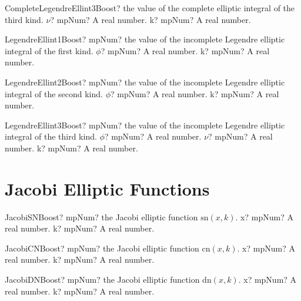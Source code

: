\documentclass[12pt,a4paper,openany]{book}
\begin{document}
\begin{mpFunctionsExtract}
\mpFunctionTwo
{CompleteLegendreEllint3Boost? the value of the complete elliptic integral of the third kind.}
{$\nu$? mpNum? A real number.}
{k? mpNum? A real number.}
\end{mpFunctionsExtract}

\begin{mpFunctionsExtract}
\mpFunctionTwo
{LegendreEllint1Boost? mpNum? the value of the incomplete Legendre elliptic integral of the first kind.}
{$\phi$? mpNum? A real number.}
{k? mpNum? A real number.}
\end{mpFunctionsExtract}

\begin{mpFunctionsExtract}
\mpFunctionTwo
{LegendreEllint2Boost? mpNum? the value of the incomplete Legendre elliptic integral of the second kind.}
{$\phi$? mpNum? A real number.}
{k? mpNum? A real number.}
\end{mpFunctionsExtract}

\begin{mpFunctionsExtract}
\mpFunctionThree
{LegendreEllint3Boost? mpNum? the value of the incomplete Legendre elliptic integral of the third kind.}
{$\phi$? mpNum? A real number.}
{$\nu$? mpNum? A real number.}
{k? mpNum? A real number.}
\end{mpFunctionsExtract}

\section{Jacobi Elliptic Functions}

\begin{mpFunctionsExtract}
\mpFunctionTwo
{JacobiSNBoost? mpNum? the Jacobi elliptic function $\text{sn}(x, k)$.}
{x? mpNum? A real number.}
{k? mpNum? A real number.}
\end{mpFunctionsExtract}

\begin{mpFunctionsExtract}
\mpFunctionTwo
{JacobiCNBoost? mpNum? the Jacobi elliptic function $\text{cn}(x, k)$.}
{x? mpNum? A real number.}
{k? mpNum? A real number.}
\end{mpFunctionsExtract}

\begin{mpFunctionsExtract}
\mpFunctionTwo
{JacobiDNBoost? mpNum? the Jacobi elliptic function $\text{dn}(x, k)$.}
{x? mpNum? A real number.}
{k? mpNum? A real number.}
\end{mpFunctionsExtract}
\end{document}
